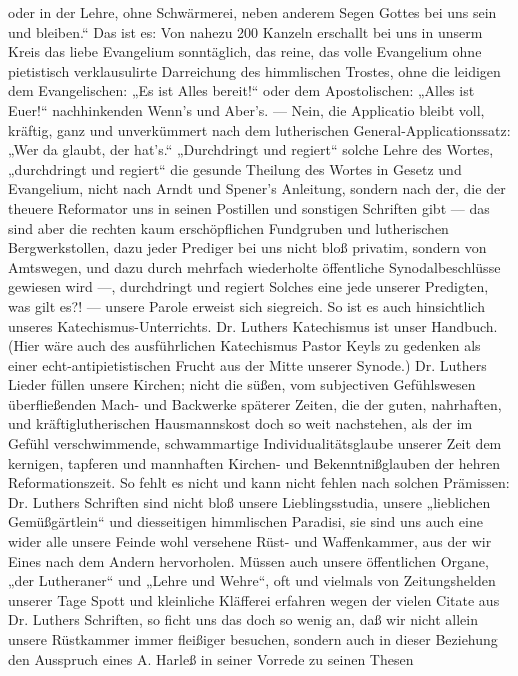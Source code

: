 oder in der Lehre, ohne Schwärmerei, neben anderem Segen Gottes bei uns sein und bleiben.“ Das ist es:
Von nahezu 200 Kanzeln erschallt bei uns in unserm Kreis das liebe Evangelium sonntäglich, das reine, das
volle Evangelium ohne pietistisch verklausulirte Darreichung des himmlischen Trostes, ohne die leidigen
dem Evangelischen: „Es ist Alles bereit!“ oder dem Apostolischen: „Alles ist Euer!“ nachhinkenden
Wenn’s und Aber’s. — Nein, die Applicatio bleibt voll, kräftig, ganz und unverkümmert nach dem
lutherischen General-Applicationssatz: „Wer da glaubt, der hat’s.“ „Durchdringt und regiert“
solche Lehre des Wortes, „durchdringt und regiert“ die gesunde Theilung des Wortes in Gesetz und
Evangelium, nicht nach Arndt und Spener’s Anleitung, sondern nach der, die der theuere Reformator
uns in seinen Postillen und sonstigen Schriften gibt — das sind aber die rechten kaum erschöpflichen
Fundgruben und lutherischen Bergwerkstollen, dazu jeder Prediger bei uns nicht bloß privatim, sondern
von Amtswegen, und dazu durch mehrfach wiederholte öffentliche Synodalbeschlüsse gewiesen wird —,
durchdringt und regiert Solches eine jede unserer Predigten, was gilt es?! — unsere Parole erweist
sich siegreich. So ist es auch hinsichtlich unseres Katechismus-Unterrichts. Dr. Luthers Katechismus
ist unser Handbuch. (Hier wäre auch des ausführlichen Katechismus Pastor Keyls zu gedenken als einer
echt-antipietistischen Frucht aus der Mitte unserer Synode.) Dr. Luthers Lieder füllen unsere Kirchen;
nicht die süßen, vom subjectiven Gefühlswesen überfließenden Mach- und Backwerke späterer Zeiten,
die der guten, nahrhaften, und kräftiglutherischen Hausmannskost doch so weit nachstehen, als der im
Gefühl verschwimmende, schwammartige Individualitätsglaube unserer Zeit dem kernigen, tapferen und
mannhaften Kirchen- und Bekenntnißglauben der hehren
Reformationszeit. So fehlt es nicht und kann nicht fehlen nach solchen Prämissen: Dr. Luthers Schriften sind
nicht bloß unsere Lieblingsstudia, unsere „lieblichen Gemüßgärtlein“ und diesseitigen himmlischen Paradisi,
sie sind uns auch eine wider alle unsere Feinde wohl versehene Rüst- und Waffenkammer, aus der wir Eines nach dem
Andern hervorholen. Müssen auch unsere öffentlichen Organe, „der Lutheraner“ und „Lehre und Wehre“, oft
und vielmals von Zeitungshelden unserer Tage Spott und kleinliche Kläfferei erfahren wegen der vielen Citate aus
Dr. Luthers Schriften, so ficht uns das doch so wenig an, daß wir nicht allein unsere Rüstkammer immer fleißiger
besuchen, sondern auch in dieser Beziehung den Ausspruch eines A. Harleß in seiner Vorrede zu seinen Thesen
